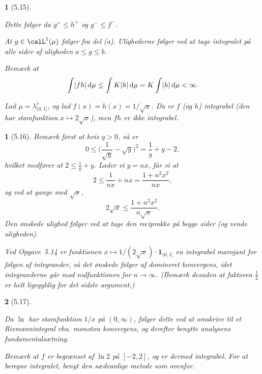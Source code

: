 \documentclass[a4paper, 11pt, article, danish, oneside]{memoir}
\newcommand{\blank}{\mathrel{\;\cdot\;}}
\newcommand{\blankifempty}[1]{\ifstrempty{#1}{\blank}{#1}}
\DeclarePairedDelimiter{\auxdelimlvert}{\lvert}{\rvert}
\newcommand{\abs}[1]{\auxdelimlvert{\blankifempty{#1}}}
\newcommand{\dif}{\mathop{}\!\mathrm{d}}
\newcommand{\indicator}[1]{\mathbf{1}_{#1}}
\newcommand{\pencilsymbol}{\raisebox{-2pt}{\normalfont\PencilLeft}}
\theoremstyle{changedotcustomnumber}
\newtheorem{opgave}{\pencilsymbol}
\theoremstyle{changedotbreakcustomnumber}
\newtheorem{opgavebreak}{\pencilsymbol}
\begin{document}
\begin{opgavebreak}[5.15]
\begin{solutionsec}
    \item Dette følger da $g^+ \leq h^+$ og $g^- \leq f^-$.

    \item At $g \in \calL^1(\mu)$ følger fra del (a). Ulighederne følger ved at tage integralet på alle sider af uligheden $a \leq g \leq b$.

    \item Bemærk at
    \begin{equation*}
        \int \abs{fh} \dif\mu
            \leq \int K \abs{h} \dif\mu
            = K \int \abs{h} \dif\mu
            < \infty.
    \end{equation*}

    \item Lad $\mu = \lambda^r_{(0,1]}$, og lad $f(x) = h(x) = 1/\sqrt{x}$. Da er $f$ (og $h$) integrabel (den har stamfunktion $x \mapsto 2\sqrt{x}$), men $fh$ er ikke integrabel.
\end{solutionsec}
\end{opgavebreak}


\begin{opgave}[5.16]
    Bemærk først at hvis $y > 0$, så er
    \begin{equation*}
        0
            \leq \biggl( \frac{1}{\sqrt{y}} - \sqrt{y} \biggr)^2
            = \frac{1}{y} + y - 2,
    \end{equation*}
    hvilket medfører at $2 \leq \frac{1}{y} + y$. Lader vi $y = nx$, får vi at
    \begin{equation*}
        2
            \leq \frac{1}{nx} + nx
            = \frac{1 + n^2 x^2}{nx},
    \end{equation*}
    og ved at gange med $\sqrt{x}$,
    \begin{equation*}
        2\sqrt{x}
            \leq \frac{1 + n^2 x^2}{n\sqrt{x}}.
    \end{equation*}
    Den ønskede ulighed følger ved at tage den reciprokke på begge sider (og vende uligheden).

    Ved Opgave~5.14 er funktionen $x \mapsto 1/(2\sqrt{x}) \cdot \indicator{(0,1]}$ en integrabel marojant for følgen af integrander, så det ønskede følger af domineret konvergens, idet integranderne går mod nulfunktionen for $n \to \infty$. (Bemærk desuden at faktoren $\frac{1}{2}$ er helt ligegyldig for det sidste argument.)
\end{opgave}


\begin{opgavebreak}[5.17]
\begin{solutionsec}
    \item Da $\ln$ har stamfunktion $1/x$ på $(0,\infty)$, følger dette ved at omskrive til et Riemannintegral vha. monoton konvergens, og derefter benytte analysens fundamentalsætning.

    \item Bemærk at $f$ er begrænset af $\ln 2$ på $[-2,2]$, og er dermed integrabel. For at beregne integralet, benyt den sædvanlige metode som ovenfor.
\end{solutionsec}
\end{opgavebreak}
\end{document}
